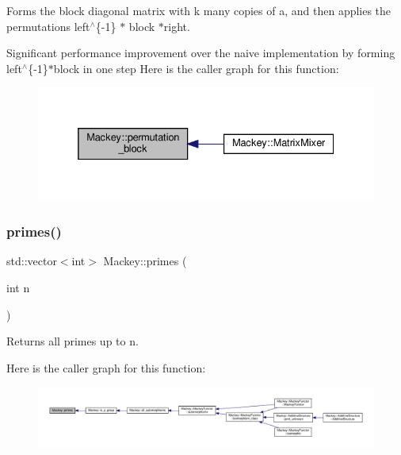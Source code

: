 Forms the block diagonal matrix with k many copies of a, and then applies the permutations left$^\wedge$\{-\/1\} $\ast$ block $\ast$right. 

Significant performance improvement over the naive implementation by forming left$^\wedge$\{-\/1\}$\ast$block in one step Here is the caller graph for this function\+:\nopagebreak
\begin{figure}[H]
\begin{center}
\leavevmode
\includegraphics[width=332pt]{namespaceMackey_ae54ebc8588d873a744541394ac5113f0_icgraph}
\end{center}
\end{figure}
\mbox{\label{namespaceMackey_aa136aece9117704b3e5180d92484ed10}} 
\subsubsection{\texorpdfstring{primes()}{primes()}}
{\footnotesize\ttfamily std\+::vector$<$int$>$ Mackey\+::primes (\begin{DoxyParamCaption}\item[{int}]{n }\end{DoxyParamCaption})}



Returns all primes up to n. 

Here is the caller graph for this function\+:\nopagebreak
\begin{figure}[H]
\begin{center}
\leavevmode
\includegraphics[width=350pt]{namespaceMackey_aa136aece9117704b3e5180d92484ed10_icgraph}
\end{center}
\end{figure}
\mbox{\label{namespaceMackey_a1257ce64369e72438023fd4e261c7c83}} 
